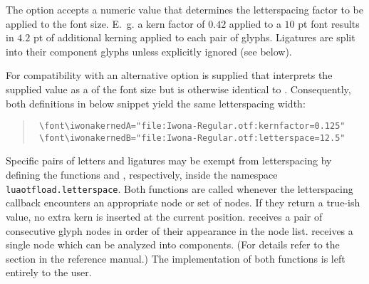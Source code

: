 \begin{description}
       The option  accepts a numeric value that
       determines the letterspacing factor to be applied to the font
       size.
       E.~g. a kern factor of $0.42$ applied to a $10$ pt font
       results in $4.2$ pt of additional kerning applied to each
       pair of glyphs.
       Ligatures are split into their component glyphs unless
       explicitly ignored (see below).

       For compatibility with \XETEX an alternative
        option is supplied that interprets the
       supplied value as a  of the font size but
       is otherwise identical to .
       Consequently, both definitions in below snippet yield the same
       letterspacing width:

       \begin{quote}
              \begin{verbatim}
 \font\iwonakernedA="file:Iwona-Regular.otf:kernfactor=0.125"
 \font\iwonakernedB="file:Iwona-Regular.otf:letterspace=12.5"
              \end{verbatim}
       \end{quote}

       Specific pairs of letters and ligatures may be exempt from
       letterspacing by defining the \LUA functions
        and ,
       respectively, inside the namespace \verb|luaotfload.letterspace|.
       Both functions are called whenever the letterspacing callback
       encounters an appropriate node or set of nodes.
       If they return a true-ish value, no extra kern is inserted at
       the current position.
        receives a pair of consecutive
       glyph nodes in order of their appearance in the node list.
        receives a single node which can be
       analyzed into components.
       (For details refer to the  section in the
       \LUATEX reference manual.)
       The implementation of both functions is left entirely to the
       user.



\end{description}
